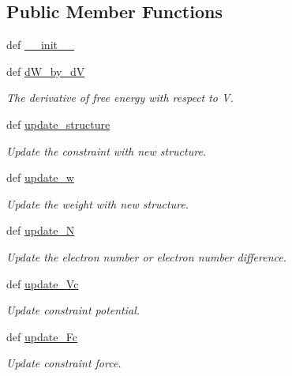 \subsection*{Public Member Functions}
\begin{DoxyCompactItemize}
\item 
def \hyperlink{classpycdft_1_1constraint_1_1base_1_1Constraint_a09b459804999f3c70182f059eaab0f03}{\-\_\-\-\_\-init\-\_\-\-\_\-}
\item 
def \hyperlink{classpycdft_1_1constraint_1_1base_1_1Constraint_abfac9dd50db90c2b98b2c3c0d68fbd97}{d\-W\-\_\-by\-\_\-d\-V}
\begin{DoxyCompactList}\small\item\em The derivative of free energy with respect to V. \end{DoxyCompactList}\item 
def \hyperlink{classpycdft_1_1constraint_1_1base_1_1Constraint_ad4434451e761dbc6c1a0d651ec6913bd}{update\-\_\-structure}
\begin{DoxyCompactList}\small\item\em Update the constraint with new structure. \end{DoxyCompactList}\item 
def \hyperlink{classpycdft_1_1constraint_1_1base_1_1Constraint_a351a7d832b50b90d6929ec457a494c19}{update\-\_\-w}
\begin{DoxyCompactList}\small\item\em Update the weight with new structure. \end{DoxyCompactList}\item 
def \hyperlink{classpycdft_1_1constraint_1_1base_1_1Constraint_ad94478e88e2cb3c4980c24b6727d11c7}{update\-\_\-\-N}
\begin{DoxyCompactList}\small\item\em Update the electron number or electron number difference. \end{DoxyCompactList}\item 
def \hyperlink{classpycdft_1_1constraint_1_1base_1_1Constraint_a4489a855f151cdc0da5e45c5f41429aa}{update\-\_\-\-Vc}
\begin{DoxyCompactList}\small\item\em Update constraint potential. \end{DoxyCompactList}\item 
def \hyperlink{classpycdft_1_1constraint_1_1base_1_1Constraint_a7a5b01d9aad18d7f57f7f106846cbce2}{update\-\_\-\-Fc}
\begin{DoxyCompactList}\small\item\em Update constraint force. \end{DoxyCompactList}\end{DoxyCompactItemize}
